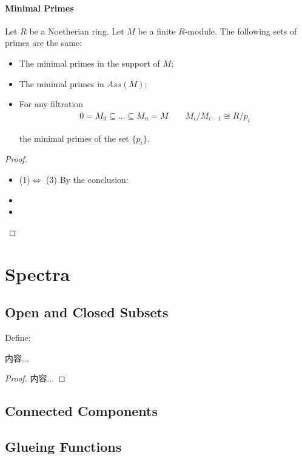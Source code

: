 \documentclass[Total.tex]{subfiles}
\begin{document}
			\subsubsection{Minimal Primes}
			\begin{proposition}
				Let $R$ be a Noetherian ring. Let $M$ be a finite $R$-module. The following sets of primes are the same:
				\begin{itemize}
					\item The minimal primes in the support of $M$;
					\item The minimal primes in $Ass(M)$;
					\item For any filtration 
					\begin{gather*}
						0=M_0\subseteq \dots\subseteq M_n=M\qquad M_i/M_{i-1}\cong R/p_i
					\end{gather*}
					
					the minimal primes of the set $\{p_i\}$.
				\end{itemize}
			\end{proposition}
			\begin{proof}
				\begin{itemize}
					\item (1)$\Leftrightarrow$ (3) By the conclusion: 
					
					\item 
					\item 
				\end{itemize}
			\end{proof}
			
	\chapter{Spectra}
		\section{Open and Closed Subsets}
			\begin{Def}
				Define:
			\end{Def}
			\begin{lemma}
				内容...
			\end{lemma}
			\begin{proof}
				内容...
			\end{proof}
		\section{Connected Components}
		\section{Glueing Functions}
\end{document}
